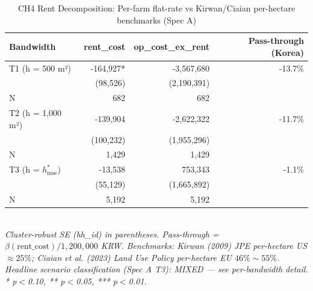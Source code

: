 \begin{table}[t]
\centering
\caption{CH4 Rent Decomposition: Per-farm flat-rate vs Kirwan/Ciaian per-hectare benchmarks (Spec A)}
\label{tab:ch4_rent_en}
\begin{tabular}{lrrr}
\toprule
Bandwidth & rent\_cost & op\_cost\_ex\_rent & Pass-through (Korea) \\
\midrule
T1 (h = 500 m²) & -164,927* & -3,567,680 & -13.7\% \\
        & (98,526) & (2,190,391) & \\
N       & 682 & 682 & \\
T2 (h = 1,000 m²) & -139,904 & -2,622,322 & -11.7\% \\
        & (100,232) & (1,955,296) & \\
N       & 1,429 & 1,429 & \\
T3 (h = $h^{*}_{\mathrm{mse}}$) & -13,538 & 753,343 & -1.1\% \\
        & (55,129) & (1,665,892) & \\
N       & 5,192 & 5,192 & \\
\bottomrule
\end{tabular}
\\
\footnotesize\textit{Cluster-robust SE (hh\_id) in parentheses. Pass-through = $\beta(\text{rent\_cost}) / 1{,}200{,}000$ KRW. Benchmarks: Kirwan (2009) JPE per-hectare US $\approx 25\%$; Ciaian et al. (2023) Land Use Policy per-hectare EU $46\% \sim 55\%$. Headline scenario classification (Spec A T3): MIXED — see per-bandwidth detail. * p$<$0.10, ** p$<$0.05, *** p$<$0.01.}
\end{table}


